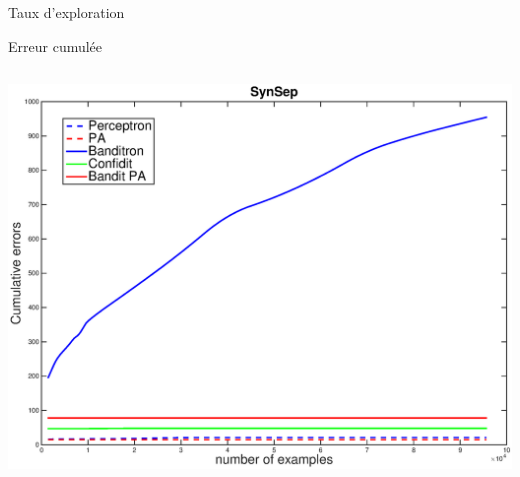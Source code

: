 \documentclass{beamer}
\begin{document}
\begin{frame}{Taux d'exploration}
		
		
\end{frame}

\begin{frame}{Erreur cumulée}
			\begin{columns}[t]
				\begin{column}{.5\linewidth}
	\centerline{
		\includegraphics[width=\linewidth]{figs/SynSep.eps}
	}
	

\end{column}
\end{columns}
\end{frame}
\end{document}
